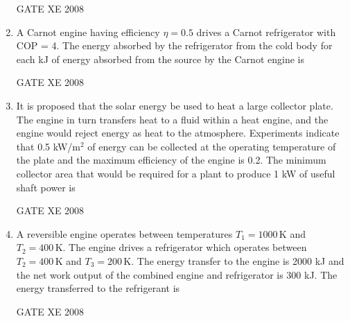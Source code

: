 \documentclass[12pt]{article}
\begin{document}
\begin{enumerate}
GATE XE 2008

\item  A Carnot engine having efficiency $\eta = 0.5$ drives a Carnot refrigerator with COP = 4. The energy absorbed by the refrigerator from the cold body for each kJ of energy absorbed from the source by the Carnot engine is  

\begin{enumerate}
\end{enumerate}

GATE XE 2008

\item  It is proposed that the solar energy be used to heat a large collector plate. The engine in turn transfers heat to a fluid within a heat engine, and the engine would reject energy as heat to the atmosphere. Experiments indicate that 0.5 kW/m$^2$ of energy can be collected at the operating temperature of the plate and the maximum efficiency of the engine is 0.2. The minimum collector area that would be required for a plant to produce 1 kW of useful shaft power is  

\begin{enumerate}
\end{enumerate}

GATE XE 2008

\item  A reversible engine operates between temperatures $T_1 = 1000 \, \mathrm{K}$ and $T_2 = 400 \, \mathrm{K}$. The engine drives a refrigerator which operates between $T_2 = 400 \, \mathrm{K}$ and $T_3 = 200 \, \mathrm{K}$. The energy transfer to the engine is 2000 kJ and the net work output of the combined engine and refrigerator is 300 kJ. The energy transferred to the refrigerant is  

\begin{enumerate}
\end{enumerate}
GATE XE 2008


\end{enumerate}
\end{document}
